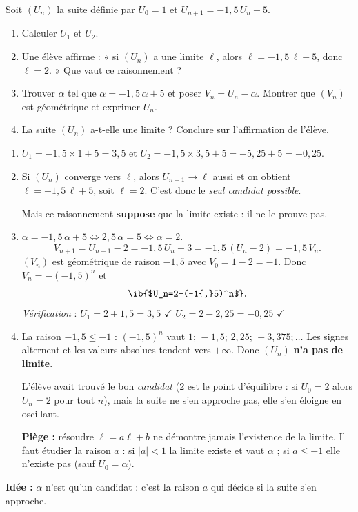 
Soit $(U_n)$ la suite définie par $U_0=1$ et $U_{n+1}=-1{,}5\,U_n+5$.

\begin{enumerate}
  \item Calculer $U_1$ et $U_2$.
  \item Une élève affirme : « si $(U_n)$ a une limite $\ell$, alors $\ell=-1{,}5\,\ell+5$, donc $\ell=2$. » Que vaut ce raisonnement ?
  \item Trouver $\alpha$ tel que $\alpha=-1{,}5\,\alpha+5$ et poser $V_n=U_n-\alpha$. Montrer que $(V_n)$ est géométrique et exprimer $U_n$.
  \item La suite $(U_n)$ a-t-elle une limite ? Conclure sur l'affirmation de l'élève.
\end{enumerate}

\begin{enumerate}
  \item $U_1=-1{,}5\times1+5=3{,}5$ et $U_2=-1{,}5\times3{,}5+5=-5{,}25+5=-0{,}25$.
  \item Si $(U_n)$ converge vers $\ell$, alors $U_{n+1}\to\ell$ aussi et on obtient $\ell=-1{,}5\,\ell+5$, soit $\ell=2$. C'est donc le \emph{seul candidat possible}.

  Mais ce raisonnement \textbf{suppose} que la limite existe : il ne le prouve pas.
  \item $\alpha=-1{,}5\,\alpha+5\iff2{,}5\,\alpha=5\iff\alpha=2$.
  $$V_{n+1}=U_{n+1}-2=-1{,}5\,U_n+3=-1{,}5\,(U_n-2)=-1{,}5\,V_n.$$
  $(V_n)$ est géométrique de raison $-1{,}5$ avec $V_0=1-2=-1$. Donc $V_n=-(-1{,}5)^n$ et
  $$ \ib{$U_n=2-(-1{,}5)^n$}.$$
  \emph{Vérification} : $U_1=2+1{,}5=3{,}5$ $\checkmark$ \quad $U_2=2-2{,}25=-0{,}25$ $\checkmark$
  \item La raison $-1{,}5\le-1$ : $(-1{,}5)^n$ vaut $1;\,-1{,}5;\,2{,}25;\,-3{,}375;\dots$ Les signes alternent et les valeurs absolues tendent vers $+\infty$. Donc $(U_n)$ \textbf{n'a pas de limite}.

  L'élève avait trouvé le bon \emph{candidat} ($2$ est le point d'équilibre : si $U_0=2$ alors $U_n=2$ pour tout $n$), mais la suite ne s'en approche pas, elle s'en éloigne en oscillant.

  \textbf{Piège :} résoudre $\ell=a\ell+b$ ne démontre jamais l'existence de la limite. Il faut étudier la raison $a$ : si $|a|<1$ la limite existe et vaut $\alpha$ ; si $a\le-1$ elle n'existe pas (sauf $U_0=\alpha$).
\end{enumerate}

\textbf{Idée :} $\alpha$ n'est qu'un candidat : c'est la raison $a$ qui décide si la suite s'en approche.
